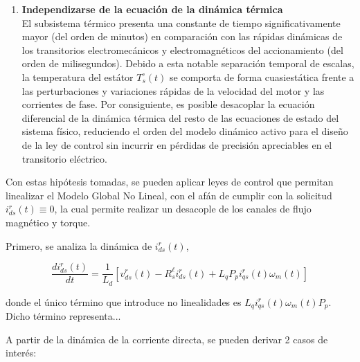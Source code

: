 \documentclass[blue,fullpaper]{ludusofficial}  %
\begin{document}
\begin{enumerate}
    \item \textbf{Independizarse de la ecuación de la dinámica térmica} \\
El subsistema térmico presenta una constante de tiempo significativamente mayor (del orden de minutos) en comparación con las rápidas dinámicas de los transitorios electromecánicos y electromagnéticos del accionamiento (del orden de milisegundos). Debido a esta notable separación temporal de escalas, la temperatura del estátor $T_s^\circ(t)$ se comporta de forma cuasiestática frente a las perturbaciones y variaciones rápidas de la velocidad del motor y las corrientes de fase. Por consiguiente, es posible desacoplar la ecuación diferencial de la dinámica térmica del resto de las ecuaciones de estado del sistema físico, reduciendo el orden del modelo dinámico activo para el diseño de la ley de control sin incurrir en pérdidas de precisión apreciables en el transitorio eléctrico.
    
\end{enumerate}

Con estas hipótesis tomadas, se pueden aplicar leyes de control que permitan linealizar el Modelo Global No Lineal, con el afán de cumplir con la solicitud $i_{ds}^{r}(t) \equiv 0$, la cual permite realizar un desacople de los canales de flujo magnético y torque.

Primero, se analiza la dinámica de $i_{ds}^{r}(t)$,

\begin{equation}
\label{variacion_ids}
    \frac{di_{ds}^{r}(t)}{dt} = \frac{1}{L_{d}} \left[ v_{ds}^{r}(t) - R_{s}^{\ell} i_{ds}^{r}(t) + L_{q}P_{p} i_{qs}^{r}(t) \omega_{m}(t) \right]
\end{equation}

donde el único término que introduce no linealidades es $ L_{q}i_{qs}^{r}(t) \omega_{m}(t)P_{p}$. Dicho término representa... 

A partir de la dinámica de la corriente directa, se pueden derivar 2 casos de interés:
\end{document}
